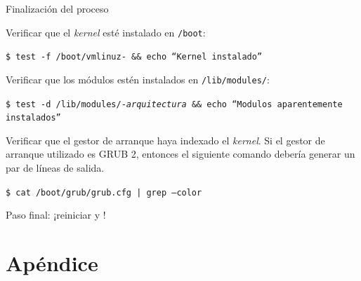 \begin{frame}{Finalización del proceso}

Verificar que el \textit{kernel} esté instalado en \texttt{/boot}:

{ \tiny
  \begin{block}{}
    \texttt{\$ test -f /boot/vmlinuz-\PATCHEDKERNELVERSION\ \&\& echo ``Kernel instalado''}
\end{block} }

Verificar que los módulos estén instalados en
\texttt{/lib/modules/\PATCHEDKERNELVERSION}:

{ \tiny
  \begin{block}{}
    \texttt{\$ test -d /lib/modules/\PATCHEDKERNELVERSION-\textit{arquitectura}
      \&\& echo ``Modulos aparentemente instalados''}
\end{block} }

Verificar que el gestor de arranque haya indexado el \textit{kernel}. Si el
gestor de arranque utilizado es GRUB 2, entonces el siguiente comando
debería generar un par de líneas de salida.

  { \tiny
  \begin{block}{}
    \texttt{\$ cat /boot/grub/grub.cfg  | grep --color \KERNELBASEVERSION}
\end{block} }

Paso final: ¡\alert{reiniciar} y !
\end{frame}

\section{Apéndice}

